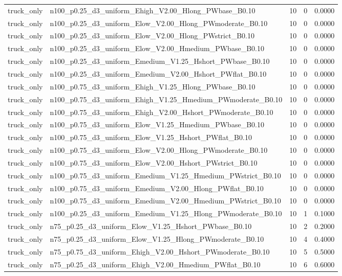 \begin{tabular}{llrrr}
truck_only & n100_p0.25_d3_uniform_Ehigh_V2.00_Hlong_PWbase_B0.10 & 10 & 0 & 0.0000 \\
truck_only & n100_p0.25_d3_uniform_Elow_V2.00_Hlong_PWmoderate_B0.10 & 10 & 0 & 0.0000 \\
truck_only & n100_p0.25_d3_uniform_Elow_V2.00_Hlong_PWstrict_B0.10 & 10 & 0 & 0.0000 \\
truck_only & n100_p0.25_d3_uniform_Elow_V2.00_Hmedium_PWbase_B0.10 & 10 & 0 & 0.0000 \\
truck_only & n100_p0.25_d3_uniform_Emedium_V1.25_Hshort_PWbase_B0.10 & 10 & 0 & 0.0000 \\
truck_only & n100_p0.25_d3_uniform_Emedium_V2.00_Hshort_PWflat_B0.10 & 10 & 0 & 0.0000 \\
truck_only & n100_p0.75_d3_uniform_Ehigh_V1.25_Hlong_PWbase_B0.10 & 10 & 0 & 0.0000 \\
truck_only & n100_p0.75_d3_uniform_Ehigh_V1.25_Hmedium_PWmoderate_B0.10 & 10 & 0 & 0.0000 \\
truck_only & n100_p0.75_d3_uniform_Ehigh_V2.00_Hshort_PWmoderate_B0.10 & 10 & 0 & 0.0000 \\
truck_only & n100_p0.75_d3_uniform_Elow_V1.25_Hmedium_PWbase_B0.10 & 10 & 0 & 0.0000 \\
truck_only & n100_p0.75_d3_uniform_Elow_V1.25_Hshort_PWflat_B0.10 & 10 & 0 & 0.0000 \\
truck_only & n100_p0.75_d3_uniform_Elow_V2.00_Hlong_PWmoderate_B0.10 & 10 & 0 & 0.0000 \\
truck_only & n100_p0.75_d3_uniform_Elow_V2.00_Hshort_PWstrict_B0.10 & 10 & 0 & 0.0000 \\
truck_only & n100_p0.75_d3_uniform_Emedium_V1.25_Hmedium_PWstrict_B0.10 & 10 & 0 & 0.0000 \\
truck_only & n100_p0.75_d3_uniform_Emedium_V2.00_Hlong_PWflat_B0.10 & 10 & 0 & 0.0000 \\
truck_only & n100_p0.75_d3_uniform_Emedium_V2.00_Hmedium_PWstrict_B0.10 & 10 & 0 & 0.0000 \\
truck_only & n100_p0.25_d3_uniform_Emedium_V1.25_Hlong_PWmoderate_B0.10 & 10 & 1 & 0.1000 \\
truck_only & n75_p0.25_d3_uniform_Elow_V1.25_Hshort_PWbase_B0.10 & 10 & 2 & 0.2000 \\
truck_only & n75_p0.25_d3_uniform_Elow_V1.25_Hlong_PWmoderate_B0.10 & 10 & 4 & 0.4000 \\
truck_only & n75_p0.75_d3_uniform_Ehigh_V2.00_Hshort_PWmoderate_B0.10 & 10 & 5 & 0.5000 \\
truck_only & n75_p0.25_d3_uniform_Ehigh_V2.00_Hmedium_PWflat_B0.10 & 10 & 6 & 0.6000 \\

\end{tabular}
